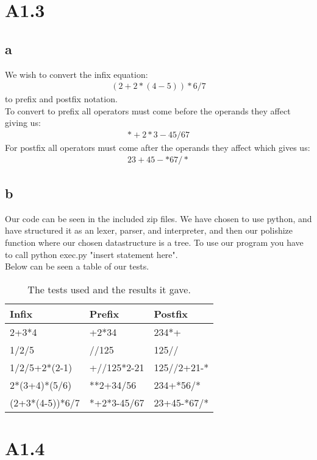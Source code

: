 \documentclass[10pt,a4paper]{article}      %
\begin{document}
\section*{A1.3}
\subsection*{a}
We wish to convert the infix equation:
\begin{align*}
(2+2*(4-5))*6/7
\end{align*}
to prefix and postfix notation. \\
To convert to prefix all operators must come before the operands they affect giving us:
\begin{align*}
*+2*3-45/67
\end{align*}
For postfix all operators must come after the operands they affect which gives us:
\begin{align*}
23+45-*67/*
\end{align*}
\subsection*{b}
Our code can be seen in the included zip files. We have chosen to use python, and have structured it as an lexer, parser, and interpreter, and then our polishize function where our chosen datastructure is a tree. To use our program you have to call python exec.py "insert statement here".
\\
Below can be seen a table of our tests.

\begin{table}[]
\centering
\caption{The tests used and the results it gave.}
\label{my-label}
\begin{tabular}{|l|l|l|}
\hline
Infix           & Prefix      & Postfix     \\ \hline
2+3*4           & +2*34       & 234*+       \\ \hline
1/2/5           & //125       & 125//       \\ \hline
1/2/5+2*(2-1)   & +//125*2-21 & 125//2+21-* \\ \hline
2*(3+4)*(5/6)   & **2+34/56   & 234+*56/*   \\ \hline
(2+3*(4-5))*6/7 & *+2*3-45/67 & 23+45-*67/* \\ \hline
\end{tabular}
\end{table}

\section*{A1.4}
\end{document}
